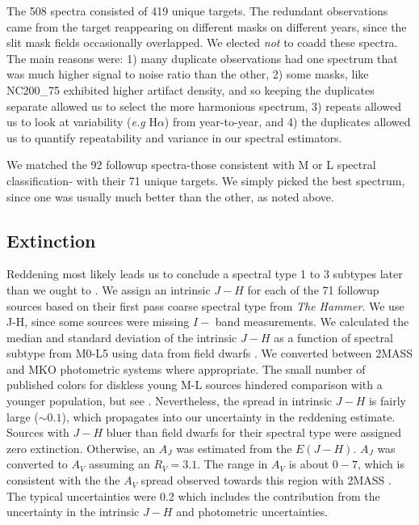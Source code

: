 \documentclass[12pt,preprint]{aastex}
\begin{document}
The 508 spectra consisted of 419 unique targets.  The redundant observations came from the target reappearing on different masks on different years, since the slit mask fields occasionally overlapped.  We elected \emph{not} to coadd these spectra.  The main reasons were: 1) many duplicate observations had one spectrum that was much higher signal to noise ratio than the other, 2) some masks, like NC200\_75 exhibited higher artifact density, and so keeping the duplicates separate allowed us to select the more harmonious spectrum, 3) repeats allowed us to look at variability (\emph{e.g} H$\alpha$) from year-to-year, and 4) the duplicates allowed us to quantify repeatability and variance in our spectral estimators.

We matched the 92 followup spectra-those consistent with M or L spectral classification- with their 71 unique targets.  We simply picked the best spectrum, since one was usually much better than the other, as noted above. 


\subsection{Extinction}
Reddening most likely leads us to conclude a spectral type 1 to 3 subtypes later than we ought to \citep{2010A&A...515A..75A}.  We assign an intrinsic $J-H$ for each of the 71 followup sources based on their first pass coarse spectral type from \emph{The Hammer}.  We use J-H, since some sources were missing $I-$ band measurements.  We calculated the median and standard deviation of the intrinsic $J-H$ as a function of spectral subtype from M0-L5 using data from field dwarfs \citep{2011AJ....141...97W,2012ApJS..201...19D}.  We converted between 2MASS and MKO photometric systems where appropriate.  The small number of published colors for diskless young M-L sources hindered comparison with a younger population, but see \citet{2013ApJS..208....9P}.  Nevertheless, the spread in intrinsic $J-H$ is fairly large ($\sim0.1$), which propagates into our uncertainty in the reddening estimate.  Sources with $J-H$ bluer than field dwarfs for their spectral type were assigned zero extinction.  Otherwise, an $A_J$ was estimated from the $E(J-H)$.  $A_J$ was converted to $A_V$ assuming an $R_V=3.1$.  The range in $A_V$ is about $0 - 7$, which is consistent with the the $A_V$ spread observed towards this region with 2MASS \citep{2008A&A...489..143L}.  The typical uncertainties were 0.2 which includes the contribution from the uncertainty in the intrinsic $J-H$ and photometric uncertainties.
\end{document}
